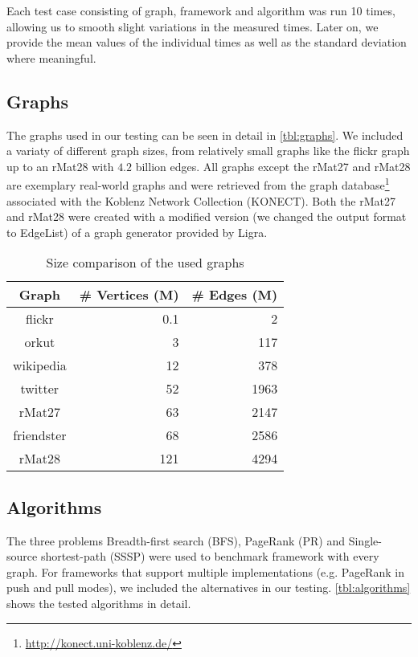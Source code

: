 Each test case consisting of graph, framework and algorithm was run 10 times, allowing us to smooth slight variations in the measured times.
Later on, we provide the mean values of the individual times as well as the standard deviation where meaningful.

\subsection{Graphs}
The graphs used in our testing can be seen in detail in \autoref{tbl:graphs}. We included a variaty of different graph sizes, from relatively small graphs like the flickr graph up to an rMat28 with $4.2$ billion edges. All graphs except the rMat27 and rMat28 are exemplary real-world graphs and were retrieved from the graph database\footnote{\url{http://konect.uni-koblenz.de/}} associated with the Koblenz Network Collection (KONECT)\cite{konect}.
Both the rMat27 and rMat28 were created with a modified version (we changed the output format to EdgeList) of a graph generator provided by Ligra.
\begin{table}
	\centering
	\begin{tabular}{crr}
		\hline
		\bf{Graph}&\# Vertices (M)&\# Edges (M)\\\hline
		flickr&    		0.1&  2\\
		orkut&          3&    117\\
		wikipedia&      12&   378\\
		twitter&     	52&   1963\\
		rMat27&         63&   2147\\
		friendster&     68&   2586\\
		rMat28&         121&  4294\\
		\hline
	\end{tabular}
	\caption{Size comparison of the used graphs}
	\label{tbl:graphs}
\end{table}


\subsection{Algorithms}
The three problems Breadth-first search (BFS), PageRank (PR) and Single-source shortest-path (SSSP) were used to benchmark framework with every graph.
For frameworks that support multiple implementations (e.g. PageRank in push and pull modes), we included the alternatives in our testing. 
\autoref{tbl:algorithms} shows the tested algorithms in detail.

